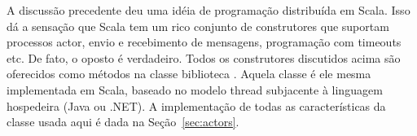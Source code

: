 A discuss\~{a}o precedente deu uma id\'{e}ia de programa\c{c}\~{a}o distribu\'{i}da em Scala. Isso
d\'{a} a sensa\c{c}\~{a}o que Scala tem um rico conjunto de construtores que suportam
processos actor, envio e recebimento de mensagens, programa\c{c}\~{a}o com timeouts etc.
De fato, o oposto \'{e} verdadeiro. Todos os construtores discutidos acima s\~{a}o 
oferecidos como m\'{e}todos na classe biblioteca . Aquela classe \'{e}
ele mesma implementada em Scala, baseado no modelo thread subjacente à linguagem 
hospedeira (Java ou .NET). A implementa\c{c}\~{a}o de todas as caracter\'{i}sticas da 
classe  usada aqui \'{e} dada na Se\c{c}\~{a}o~\ref{sec:actors}.     

